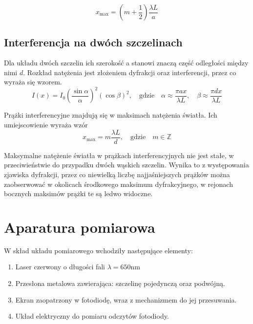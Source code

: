 \documentclass{fizykalab}
\newcommand{\nm}{\ensuremath{\text{nm}}}
\begin{document}
\begin{equation}
    \label{eq_x_max_dyfr}
    x_\text{max} = \left(
        m + \frac{1}{2}
    \right)
    \frac{\lambda L}{a}
\end{equation}

\newpage
\subsection{Interferencja na dwóch szczelinach}
Dla układu dwóch szczelin ich szerokość a stanowi znaczą część odległości 
między nimi $d$. Rozkład natężenia jest złożeniem dyfrakcji oraz 
interferencji, przez co wyraża się wzorem.
\begin{equation}
    I(x) = I_0 {\left(
        \frac{\sin \alpha}{\alpha}
    \right)}^2 
    (\cos \beta)^2
    ,\quad \text{gdzie} \quad
    \alpha \approx \frac{\pi ax}{\lambda L},
    \quad \beta \approx \frac{\pi d x}{\lambda L}
\end{equation}

Prążki interferencyjne znajdują się w maksimach natężenia światła.
Ich umiejscowienie wyraża wzór
\begin{equation}
    \label{eq_x_max_interf}
    x_\text{max} = m \frac{\lambda L}{d}, \quad \text{gdzie} \quad m \in \mathbb{Z}
\end{equation}

Maksymalne natężenie światła w prążkach interferencyjnych nie jest stałe,
w przeciwieństwie do przypadku dwóch wąskich szczelin. Wynika to z występowania
zjawiska dyfrakcji, przez co niewielką liczbę najjaśniejszych prążków można 
zaobserwować w okolicach środkowego maksimum dyfrakcyjnego, w rejonach 
bocznych maksimów prążki te są ledwo widoczne.

\section{Aparatura pomiarowa}
W skład układu pomiarowego wchodziły następujące elementy:
\begin{enumerate}
    \item Laser czerwony o długości fali $\lambda = 650 \nm$
    \item Przesłona metalowa zawierająca: szczelinę pojedynczą oraz podwójną.
    \item Ekran zaopatrzony w fotodiodę, wraz z mechanizmem do jej przesuwania.
    \item Układ elektryczny do pomiaru odczytów fotodiody.
\end{enumerate}
\end{document}
